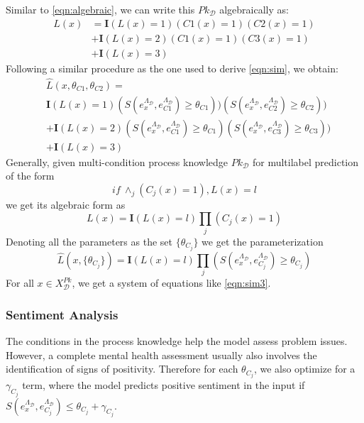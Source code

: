 \documentclass[letterpaper]{article} %
\begin{document}
Similar to \eqref{eqn:algebraic}, we can write this $Pk_{\mathcal{D}}$ algebraically as:
\begin{equation}\label{eqn:algebraic2}
\begin{split}
L(x) &= \mathbf{I}(L(x)=1)(C1(x)=1)(C2(x)=1) \\
& + \mathbf{I}(L(x)=2)(C1(x)=1)(C3(x)=1) \\
& + \mathbf{I}(L(x)=3)
\end{split}
\end{equation}
Following a similar procedure as the one used to derive \eqref{eqn:sim}, we obtain:
\begin{equation}\label{eqn:sim2}
\begin{split}
& \hat{L}(x, \theta_{C1},\theta_{C2}) = \\
& \mathbf{I}(L(x)=1)(S(e^{\Lambda_{\mathcal{D}}}_x, e^{\Lambda_{\mathcal{D}}}_{C1}) \geq \theta_{C1})) (S(e^{\Lambda_{\mathcal{D}}}_x, e^{\Lambda_{\mathcal{D}}}_{C2}) \geq \theta_{C2})) \\
& + \mathbf{I}(L(x)=2)(S(e^{\Lambda_{\mathcal{D}}}_x, e^{\Lambda_{\mathcal{D}}}_{C1}) \geq \theta_{C1})(S(e^{\Lambda_{\mathcal{D}}}_x, e^{\Lambda_{\mathcal{D}}}_{C3}) \geq \theta_{C3})) \\
& + \mathbf{I}(L(x)=3)
\end{split}
\end{equation}
Generally, given multi-condition process knowledge $Pk_{\mathcal{D}}$ for multilabel prediction of the form
\[if~\land_j(C_j(x)=1), L(x) = l\]
we get its algebraic form as
\begin{equation}\label{sim:algebraic3}
    L(x) = \mathbf{I}(L(x)=l)\prod_j(C_j(x)=1)
\end{equation}
Denoting all the parameters as the set $\{\theta_{C_j}\}$ we get the parameterization
\begin{equation}\label{eqn:sim3}
    \hat{L}(x, \{\theta_{C_j}\}) = \mathbf{I}(L(x)=l)\prod_j(S(e^{\Lambda_{\mathcal{D}}}_x, e^{\Lambda_{\mathcal{D}}}_{C_j}) \geq \theta_{C_j})
\end{equation}
For all $x \in X^{Pk}_{\mathcal{D}}$, we get a system of equations like \eqref{eqn:sim3}.
\subsubsection{Sentiment Analysis}
The conditions in the process knowledge help the model assess problem issues. However, a complete mental health assessment usually also involves the identification of signs of positivity. Therefore for each $\theta_{C_j}$, we also optimize for a $\gamma_{C_j}$ term, where the model predicts positive sentiment in the input if $S(e^{\Lambda_{\mathcal{D}}}_x, e^{\Lambda_{\mathcal{D}}}_{C_j}) \leq \theta_{C_j} + \gamma_{C_j}$.
\end{document}
